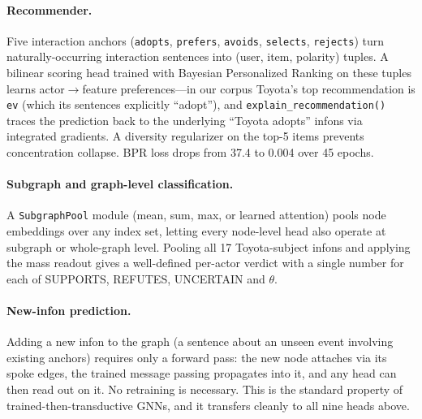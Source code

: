 \documentclass[11pt,a4paper]{article}
\begin{document}
\paragraph{Recommender.} Five interaction anchors (\texttt{adopts},
\texttt{prefers}, \texttt{avoids}, \texttt{selects},
\texttt{rejects}) turn naturally-occurring interaction sentences
into (user, item, polarity) tuples. A bilinear scoring head
trained with Bayesian Personalized Ranking on these tuples learns
actor$\to$feature preferences---in our corpus Toyota's top
recommendation is \texttt{ev} (which its sentences explicitly
``adopt''), and \texttt{explain\_recommendation()} traces the
prediction back to the underlying ``Toyota adopts'' infons via
integrated gradients. A diversity regularizer on the top-5 items
prevents concentration collapse. BPR loss drops from 37.4 to
0.004 over 45 epochs.

\paragraph{Subgraph and graph-level classification.} A
\texttt{SubgraphPool} module (mean, sum, max, or learned
attention) pools node embeddings over any index set, letting
every node-level head also operate at subgraph or whole-graph
level. Pooling all 17 Toyota-subject infons and applying the mass
readout gives a well-defined per-actor verdict with a single
number for each of SUPPORTS, REFUTES, UNCERTAIN and $\theta$.

\paragraph{New-infon prediction.} Adding a new infon to the graph
(a sentence about an unseen event involving existing anchors)
requires only a forward pass: the new node attaches via its spoke
edges, the trained message passing propagates into it, and any
head can then read out on it. No retraining is necessary. This
is the standard property of trained-then-transductive GNNs, and
it transfers cleanly to all nine heads above.
\end{document}
